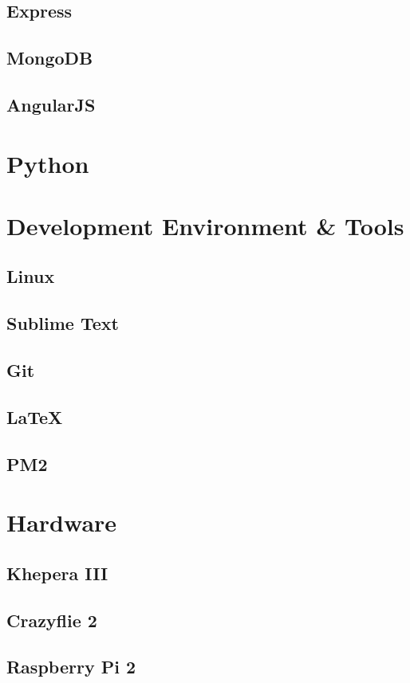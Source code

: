 \subsection{Express}
\subsection{MongoDB}
\subsection{AngularJS} \label{AngularJS}
\section{Python}
\section{Development Environment \& Tools}
\subsection{Linux}
\subsection{Sublime Text}
\subsection{Git}
\subsection{\LaTeX}
\subsection{PM2}
\section{Hardware}
\subsection{Khepera III}
\subsection{Crazyflie 2}
\subsection{Raspberry Pi 2}
